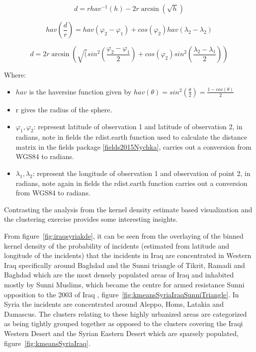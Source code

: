 \begin{equation} d = r hav^{-1}(h) - 2r\arcsin(\sqrt{h})  \label{eq:haversine1}  \end{equation}

\begin{equation} hav(\frac{d}{r}) =hav(\varphi_{2}-\varphi_{1})+cos(\varphi_{2})hav(\lambda_{2}-\lambda_{2})  \label{eq:haversine2}  \end{equation}

\begin{equation} d=2r \arcsin(\sqrt(sin^{2}(\frac{\varphi_2-\varphi_1}{2})+cos(\varphi_2)sin^{2}(\frac{\lambda_2-\lambda_1}{2}))  \label{eq:haversine3}  \end{equation}

Where:
\begin{itemize}
\item[]  $hav$ is the haversine function given by $hav(\theta)=sin^2(\frac{\theta}{2})=\frac{1-cos(\theta)}{2}$
\item[] r gives the radius of the sphere.
\item[] $\varphi_1, \varphi_2$: represent latitude of observation 1 and latitude of observation 2, in radians, note in fields the rdist.earth function used to calculate the distance matrix in the fields package \ref{fields2015Nychka}, carries out a conversion from WGS84 \citep{misra1996integrated} to radians.
\item[]  $\lambda_1,\lambda_2$: represent the longitude of observation 1 and observation of point 2, in radians, note again in fields the rdist.earth function carries out a conversion from WGS84 \citep{misra1996integrated} to radians.
\end{itemize}

Contrasting the analysis from the kernel density estimate based visualization and the clustering exercise provides some interesting insights.
   
From figure~\ref{fig:iraqsyriakde}, it can be seen from the overlaying of the binned kernel density of the probability of incidents (estimated from latitude and longitude of the incidents) that the incidents in Iraq are concentrated in Western Iraq specifically around Baghdad and the Sunni triangle \citep{rand2015iraq} of Tikrit, Ramadi and Baghdad which are the most densely populated areas of Iraq and inhabited mostly by Sunni Muslims, which became the centre for armed resistance Sunni opposition to the 2003 of Iraq \citep{hashim2005insurgency}, figure~\ref{fig:kmeansSyriaIraqSunniTriangle}. In Syria the incidents are concentrated around Aleppo, Homs, Latakia and Damascus. The clusters relating to these highly urbanized areas are categorized as being tightly grouped together as opposed to the clusters covering the Iraqi Western Desert and the Syrian Eastern Desert which are sparsely populated, figure~\ref{fig:kmeansSyriaIraq}.

